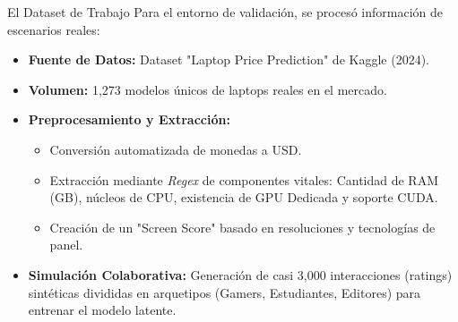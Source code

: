 \documentclass[aspectratio=169]{beamer}
\begin{document}
\begin{frame}{El Dataset de Trabajo}
    Para el entorno de validación, se procesó información de escenarios reales:
    
    \vspace{0.3cm}
    \begin{itemize}
        \item \textbf{Fuente de Datos:} Dataset "Laptop Price Prediction" de Kaggle (2024).
        \item \textbf{Volumen:} 1,273 modelos únicos de laptops reales en el mercado.
        \item \textbf{Preprocesamiento y Extracción:}
        \begin{itemize}
            \item Conversión automatizada de monedas a USD.
            \item Extracción mediante \textit{Regex} de componentes vitales: Cantidad de RAM (GB), núcleos de CPU, existencia de GPU Dedicada y soporte CUDA.
            \item Creación de un "Screen Score" basado en resoluciones y tecnologías de panel.
        \end{itemize}
        \item \textbf{Simulación Colaborativa:} Generación de casi 3,000 interacciones (ratings) sintéticas divididas en arquetipos (Gamers, Estudiantes, Editores) para entrenar el modelo latente.
    \end{itemize}
\end{frame}
\end{document}
